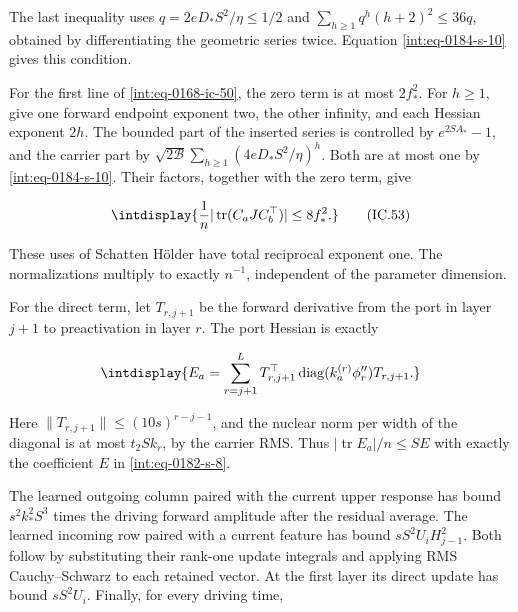 
The last inequality uses \(q=2eD_*S^2/\eta\le1/2\) and \(\sum_{h\ge1}q^h(h+2)^2\le36q\), obtained by differentiating the geometric series twice. Equation \eqref{int:eq-0184-s-10} gives this condition.



For the first line of \eqref{int:eq-0168-ic-50}, the zero term is at most \(2f_*^2\). For \(h\ge1\), give one forward endpoint exponent two, the other infinity, and each Hessian exponent \(2h\). The bounded part of the inserted series is controlled by \(e^{2SA_*}-1\), and the carrier part by \(\sqrt{2\mathcal B}\sum_{h\ge1}(4eD_*S^2/\eta)^h\). Both are at most one by \eqref{int:eq-0184-s-10}. Their factors, together with the zero term, give


\begingroup\renewcommand{\theHequation}{intdisplay.357}
\begin{equation}
\intdisplay{
\frac{1}{n}|\operatorname{tr}(C_aJ C_b^\top)|\le8f_*^2.
}
\tag{IC.53}
\label{int:eq-0171-ic-53}
\end{equation}
\endgroup


These uses of Schatten Hölder have total reciprocal exponent one. The normalizations multiply to exactly \(n^{-1}\), independent of the parameter dimension.



For the direct term, let \(T_{r,\allowbreak j+1}\) be the forward derivative from the port in layer \(j+1\) to preactivation in layer \(r\). The port Hessian is exactly


\begingroup\renewcommand{\theHequation}{intdisplay.358}
\begin{equation*}
\intdisplay{
E_a=\sum_{r=j+1}^L T_{r,j+1}^\top
       \operatorname{diag}(k_a^{(r)}\phi_r'')T_{r,j+1}.
}
\end{equation*}
\endgroup


Here \(\|T_{r,\allowbreak j+1}\|\le(10s)^{r-j-1}\), and the nuclear norm per width of the diagonal is at most \(t_2Sk_r\), by the carrier RMS. Thus \(|\operatorname{tr}E_a|/n\le SE\) with exactly the coefficient \(E\) in \eqref{int:eq-0182-s-8}.



The learned outgoing column paired with the current upper response has bound \(s^2k_*^2S^3\) times the driving forward amplitude after the residual average. The learned incoming row paired with a current feature has bound \(sS^2U_iH_{j-1}^2\). Both follow by substituting their rank-one update integrals and applying RMS Cauchy--Schwarz to each retained vector. At the first layer its direct update has bound \(sS^2U_i\). Finally, for every driving time,


